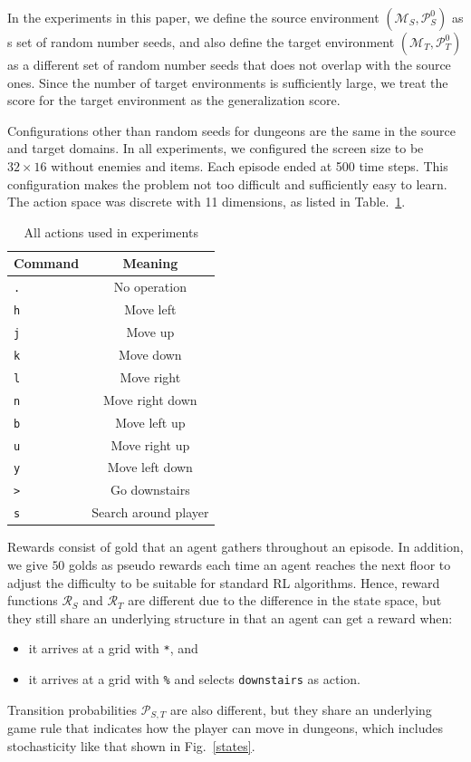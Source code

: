 \documentclass[conference]{IEEEtran}
\newcommand\sco{stochasticity}
\newcommand\sym{\texttt}
\begin{document}
In the experiments in this paper, we define the source environment
$(\mathcal{M}_S, \mathcal{P}^0_S)$ as s set of random number seeds, and
also define the target environment $(\mathcal{M}_T, \mathcal{P}^0_T)$ as
a different set of random number seeds that does not overlap with the
source ones.
Since the number of target environments is sufficiently large, we treat
the score for the target environment as the generalization score.

Configurations other than random seeds for dungeons are the same in the
source and target domains. 
In all experiments, we configured the screen size to be $32\times 16$
without enemies and items.
Each episode ended at 500 time steps.
This configuration makes the problem not too difficult and sufficiently
easy to learn.
The action space was discrete with 11 dimensions, as listed in 
Table.~\ref{rogue-actions}.
\begin{table}[t]
  \centering
  \caption{All actions used in experiments} \label{rogue-actions}
  \begin{tabular}{l|c}\hline
   Command & Meaning \\ \hline
   \texttt{.} & No operation \\
   \texttt{h} & Move left \\
   \texttt{j} & Move up \\
   \texttt{k} & Move down \\
   \texttt{l} & Move right \\
   \texttt{n} & Move right down \\
   \texttt{b} & Move left up \\
   \texttt{u} & Move right up \\
   \texttt{y} & Move left down \\
   \texttt{>} & Go downstairs \\
   \texttt{s} & Search around player \\ \hline
  \end{tabular}
\end{table}

Rewards consist of gold that an agent gathers throughout an episode.
In addition, we give $50$ golds as pseudo rewards each time an agent
reaches the next floor to adjust the difficulty to be suitable for
standard RL algorithms.
Hence, reward functions $\mathcal{R}_{S}$ and $\mathcal{R}_{T}$
are different due to the difference in the state space, but they still
share an underlying structure in that an agent can get a reward when:
\begin{itemize}
 \item it arrives at a grid with \sym{*}, and
 \item it arrives at a grid with \sym{\%} and selects \sym{downstairs}
       as action.
\end{itemize}
Transition probabilities $\mathcal{P}_{S, T}$ are also different, but they
share an underlying game rule that indicates how the player can move in
dungeons, which includes \sco{} like that shown in Fig.~\ref{states}.
\end{document}
